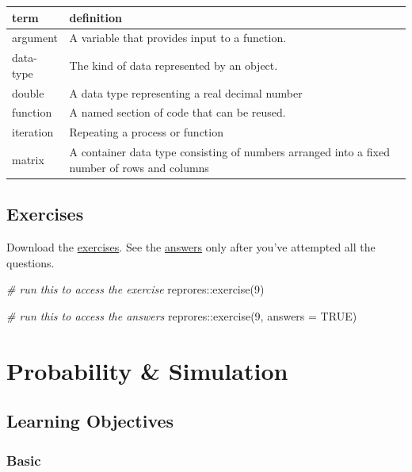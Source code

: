 \documentclass[
  oneside]{book}
\newenvironment{Shaded}{\begin{snugshade}}{\end{snugshade}}
\newcommand{\AttributeTok}[1]{\textcolor[rgb]{0.77,0.63,0.00}{#1}}
\newcommand{\CommentTok}[1]{\textcolor[rgb]{0.56,0.35,0.01}{\textit{#1}}}
\newcommand{\ConstantTok}[1]{\textcolor[rgb]{0.00,0.00,0.00}{#1}}
\newcommand{\DecValTok}[1]{\textcolor[rgb]{0.00,0.00,0.81}{#1}}
\newcommand{\FunctionTok}[1]{\textcolor[rgb]{0.00,0.00,0.00}{#1}}
\newcommand{\NormalTok}[1]{#1}
\newcommand{\SpecialCharTok}[1]{\textcolor[rgb]{0.00,0.00,0.00}{#1}}
\begin{document}
\begin{tabular}{l|l}
\hline
term & definition\\
\hline
argument & A variable that provides input to a function.\\
\hline
data-type & The kind of data represented by an object.\\
\hline
double & A data type representing a real decimal number\\
\hline
function & A named section of code that can be reused.\\
\hline
iteration & Repeating a process or function\\
\hline
matrix & A container data type consisting of numbers arranged into a fixed number of rows and columns\\
\hline
\end{tabular}

\hypertarget{exercises-func}{%
\section{Exercises}\label{exercises-func}}

Download the \href{exercises/09_func_exercise.Rmd}{exercises}. See the \href{exercises/09_func_answers.Rmd}{answers} only after you've attempted all the questions.

\begin{Shaded}
\begin{Highlighting}[]
\CommentTok{\# run this to access the exercise}
\NormalTok{reprores}\SpecialCharTok{::}\FunctionTok{exercise}\NormalTok{(}\DecValTok{9}\NormalTok{)}

\CommentTok{\# run this to access the answers}
\NormalTok{reprores}\SpecialCharTok{::}\FunctionTok{exercise}\NormalTok{(}\DecValTok{9}\NormalTok{, }\AttributeTok{answers =} \ConstantTok{TRUE}\NormalTok{)}
\end{Highlighting}
\end{Shaded}

\hypertarget{sim}{%
\chapter{Probability \& Simulation}\label{sim}}

\hypertarget{ilo8}{%
\section{Learning Objectives}\label{ilo8}}

\hypertarget{basic-6}{%
\subsection{Basic}\label{basic-6}}
\end{document}
